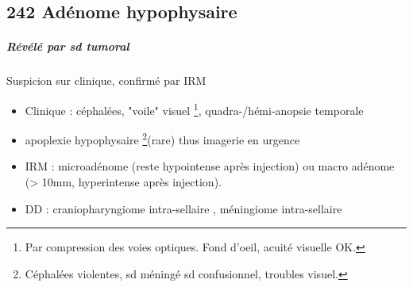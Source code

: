 \documentclass[11pt]{article}
\begin{document}
\subsection{242 Adénome hypophysaire}
\label{sec:orgf02ab66}
\subparagraph{Révélé par sd tumoral}
\label{sec:org84a4d7b}
Suspicion sur clinique, confirmé par IRM
\begin{itemize}
\item Clinique : céphalées, "voile" visuel \footnote{Par compression des voies optiques. Fond d'oeil,
acuité visuelle OK.}, quadra-/hémi-anopsie temporale
\item \danger apoplexie hypophysaire \footnote{Céphalées violentes, sd méningé sd confusionnel, troubles visuel.}(rare) thus imagerie en urgence \danger
\item IRM : microadénome (reste hypointense après injection) ou macro adénome (>
10mm, hyperintense après injection).
\item DD : craniopharyngiome intra-sellaire , méningiome intra-sellaire
\end{itemize}
\end{document}
